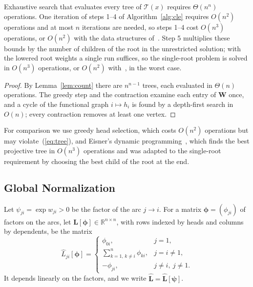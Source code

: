 \documentclass[mathematics,article,submit,pdftex,oneauthor]{Definitions/mdpi}
\newcommand{\T}{\mathcal T}
\newcommand{\R}{\mathbb R}
\newcommand{\Lh}{\hat{\mathbf L}}
\begin{document}
\begin{Proposition}[Complexity]\label{prop:complexity}
Exhaustive search that evaluates every tree of $\T(x)$ requires $\Theta(n^{n})$ operations.
One iteration of steps 1--4 of Algorithm~\ref{alg:cle} requires $O(n^2)$ operations and at most $n$ iterations are needed, so steps 1--4 cost $O(n^3)$ operations, or $O(n^2)$ with the data structures of~\cite{Tarjan1977}.
Step 5 multiplies these bounds by the number of children of the root in the unrestricted solution; with the lowered root weights a single run suffices, so the single-root problem is solved in $O(n^3)$ operations, or $O(n^2)$ with~\cite{Tarjan1977}, in the worst case.
\end{Proposition}
\begin{proof}
By Lemma~\ref{lem:count} there are $n^{n-1}$ trees, each evaluated in $\Theta(n)$ operations.
The greedy step and the contraction examine each entry of $\mathbf W$ once, and a cycle of the functional graph $i\mapsto h_i$ is found by a depth-first search in $O(n)$; every contraction removes at least one vertex.
\end{proof}

For comparison we use greedy head selection, which costs $O(n^2)$ operations but may violate~(\ref{eq:tree}), and Eisner's dynamic programming~\cite{Eisner1996}, which finds the best projective tree in $O(n^3)$ operations and was adapted to the single-root requirement by choosing the best child of the root at the end.

\subsection{Global Normalization}
Let $\psi_{ji}=\exp w_{ji}>0$ be the factor of the arc $j\to i$.
For a matrix $\boldsymbol\phi=(\phi_{ji})$ of factors on the arcs, let $\Lh[\boldsymbol\phi]\in\R^{n\times n}$, with rows indexed by heads and columns by dependents, be the matrix
\begin{equation}\label{eq:laplacian}
\hat L_{ji}[\boldsymbol\phi]=
\begin{cases}
\phi_{0i}, & j=1,\\
\sum_{k=1,\,k\neq i}^{n}\phi_{ki}, & j=i\neq1,\\
-\phi_{ji}, & j\neq i,\ j\neq1.
\end{cases}
\end{equation}
It depends linearly on the factors, and we write $\Lh=\Lh[\boldsymbol\psi]$.
\end{document}
